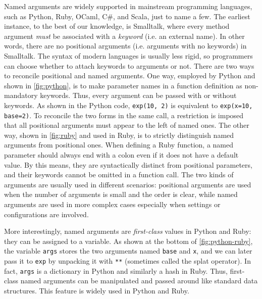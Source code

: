 Named arguments are widely supported in mainstream programming languages, such
as Python, Ruby, OCaml, C\#, and Scala, just to name a few. The earliest
instance, to the best of our knowledge, is Smalltalk, where every method
argument \emph{must} be associated with a \emph{keyword} (i.e. an external
name). In other words, there are no positional arguments (i.e. arguments with no
keywords) in Smalltalk. The syntax of modern languages is usually less rigid, so
programmers can choose whether to attach keywords to arguments or not. There are
two ways to reconcile positional and named arguments. One way, employed by
Python and shown in \autoref{fig:python}, is to make parameter names in a
function definition as non-mandatory keywords. Thus, every argument can be
passed with or without keywords. As shown in the Python code,
\lstinline{exp(10, 2)} is equivalent to \lstinline{exp(x=10, base=2)}. To
reconcile the two forms in the same call, a restriction is imposed that all
positional arguments must appear to the left of named ones. The other way, shown
in \autoref{fig:ruby} and used in Ruby, is to strictly distinguish named
arguments from positional ones. When defining a Ruby function, a named parameter
should always end with a colon even if it does not have a default value. By this
means, they are syntactically distinct from positional parameters, and their
keywords cannot be omitted in a function call. The two kinds of arguments are
usually used in different scenarios: positional arguments are used when the
number of arguments is small and the order is clear, while named arguments are
used in more complex cases especially when settings or configurations are
involved.

More interestingly, named arguments are \emph{first-class} values in Python and
Ruby: they can be assigned to a variable. As shown at the bottom of
\autoref{fig:python-ruby}, the variable \lstinline{args} stores the two
arguments named \lstinline{base} and \lstinline{x}, and we can later pass it to
\lstinline{exp} by unpacking it with \lstinline{**} (sometimes called the splat
operator). In fact, \lstinline{args} is a dictionary in Python and similarly a
hash in Ruby. Thus, first-class named arguments can be manipulated and passed
around like standard data structures. This feature is widely used in Python and
Ruby.

